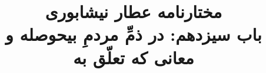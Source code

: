 \documentclass[14pt,b5paper]{article}
\begin{document}
\title{\Huge مختارنامه عطار نیشابوری \\
باب سیزدهم: در ذمِّ مردمِ ب‍یحوصله و معانی که تعلّق به}
\author{ }
\date{ }
\maketitle
\newpage
\tableofcontents
\newpage

\newpage

\newpage

\newpage

\newpage

\newpage

\newpage

\newpage

\newpage

\newpage

\newpage

\newpage

\newpage

\newpage

\newpage

\newpage

\newpage

\newpage

\newpage

\newpage

\newpage

\newpage

\newpage

\newpage

\newpage

\newpage

\newpage

\newpage

\newpage

\newpage

\newpage
\end{document}
